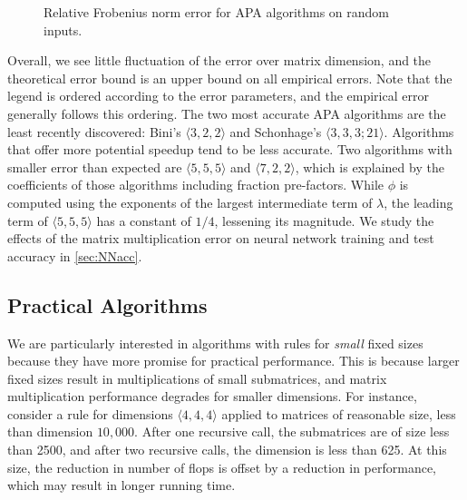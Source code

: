 \documentclass[conference]{IEEEtran}
\newcommand{\dims}[1]{\langle #1 \rangle}
\newcommand{\datafile}{}
\begin{document}
\begin{figure}
\centering
\renewcommand{\datafile}{data/matmul_acc.dat}

\caption{Relative Frobenius norm error for APA algorithms on random inputs.}
\label{fig:accuracy}
\end{figure}

Overall, we see little fluctuation of the error over matrix dimension, and the theoretical error bound is an upper bound on all empirical errors.
Note that the legend is ordered according to the error parameters, and the empirical error generally follows this ordering.
The two most accurate APA algorithms are the least recently discovered: Bini's $\dims{3,2,2}$ and Schonhage's $\dims{3,3,3;21}$.
Algorithms that offer more potential speedup tend to be less accurate.
Two algorithms with smaller error than expected are $\dims{5,5,5}$ and $\dims{7,2,2}$, which is explained by the coefficients of those algorithms including fraction pre-factors.
While $\phi$ is computed using the exponents of the largest intermediate term of $\lambda$, the leading term of $\dims{5,5,5}$ has a constant of $1/4$, lessening its magnitude. 
We study the effects of the matrix multiplication error on neural network training and test accuracy in \cref{sec:NNacc}.

\subsection{Practical Algorithms}

We are particularly interested in algorithms with rules for \emph{small} fixed sizes because they have more promise for practical performance.
This is because larger fixed sizes result in multiplications of small submatrices, and matrix multiplication performance degrades for smaller dimensions.
For instance, consider a rule for dimensions $\dims{4,4,4}$ applied to matrices of reasonable size, less than dimension $10{,}000$.
After one recursive call, the submatrices are of size less than 2500, and after two recursive calls, the dimension is less than 625.
At this size, the reduction in number of flops is offset by a reduction in performance, which may result in longer running time.
\end{document}
